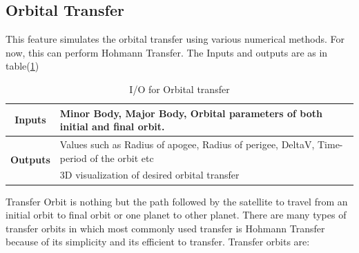 \subsection{Orbital Transfer}
This feature simulates the orbital transfer using various numerical methods. For now, this can perform Hohmann Transfer. The Inputs and outputs are as in table(\ref{tab:ot})
\begin{table}[H]
\centering
\begin{tabular}{@{}cl@{}}
\toprule
\multicolumn{1}{c}{\textbf{Inputs}} & Minor Body, Major Body, Orbital parameters of both initial and final orbit.                     \\ \midrule
\multirow{2}{*}{\textbf{Outputs}}   & Values such as Radius of apogee, Radius of perigee, DeltaV, Time-period of the orbit etc \\ \cmidrule(l){2-2} 
                           & 3D visualization of desired orbital transfer \\ \bottomrule
\end{tabular}
\caption{I/O for Orbital transfer}
\label{tab:ot}
\end{table}
Transfer Orbit is nothing but the path followed by the satellite to travel from an initial orbit to final 
orbit or one planet to other planet. There are many types of transfer orbits in which most commonly used transfer 
is Hohmann Transfer because of its simplicity and its efficient to transfer.
Transfer orbits are:
